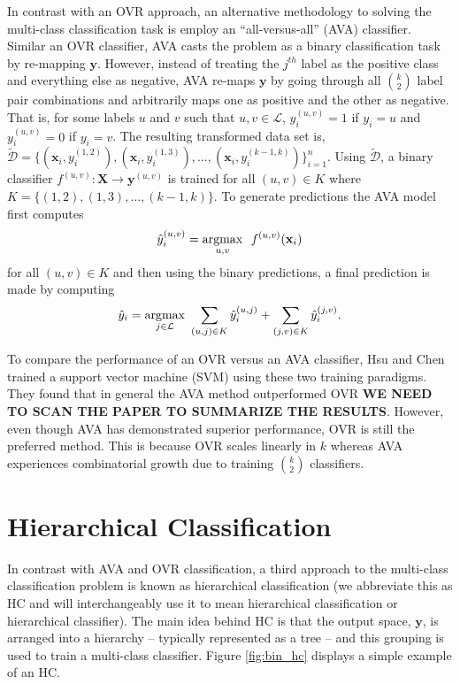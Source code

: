 \documentclass[../thesis.tex]{subfiles}
\begin{document}
In contrast with an OVR approach, an alternative methodology to solving the multi-class classification task is employ an ``all-versus-all'' (AVA) classifier. Similar an OVR classifier, AVA casts the problem as a binary classification task by re-mapping $\mathbf{y}$. However, instead of treating the $j^{th}$ label as the positive class and everything else as negative, AVA re-maps $\mathbf{y}$ by going through all $\binom{k}{2}$ label pair combinations and arbitrarily maps one as positive and the other as negative. That is, for some labels $u$ and $v$ such that $u, v \in \mathcal{L}$, $y_i^{(u,v)} = 1$ if $y_i = u$ and $y_i^{(u,v)} = 0$ if $y_i = v$. The resulting transformed data set is, $\widetilde{\mathcal{D}} = \{(\mathbf{x}_i, y_i^{(1,2)}), (\mathbf{x}_i, y_i^{(1,3)}), \ldots, (\mathbf{x}_i, y_i^{(k-1, k)})\}_{i=1}^n$. Using $\widetilde{\mathcal{D}}$, a binary classifier $f^{(u,v)}: \mathbf{X} \rightarrow \mathbf{y}^{(u,v)}$ is trained for all $(u, v) \in K$ where $K = \{(1, 2), (1, 3), \ldots, (k-1, k)\}$. To generate predictions the AVA model first computes
\begin{equation}
    \hat{y}_i^{(u,v)} = \underset{u, v}{\argmax} \ \ f^{(u,v)}(\mathbf{x}_i)
\end{equation}
for all $(u,v) \in K$ and then using the binary predictions, a final prediction is made by computing
\begin{equation}
    \hat{y}_i = \underset{j \in \mathcal{L}}{\operatorname*{argmax}} \ \sum_{(u, j) \in K} \hat{y}_i^{(u, j)} + \sum_{(j, v) \in K} \hat{y}_i^{(j, v)}.
\end{equation}

To compare the performance of an OVR versus an AVA classifier, Hsu and Chen \cite{hsu2002comparison} trained a support vector machine (SVM) using these two training paradigms. They found that in general the AVA method outperformed OVR \textbf{WE NEED TO SCAN THE PAPER TO SUMMARIZE THE RESULTS}. However, even though AVA has demonstrated superior performance, OVR is still the preferred method. This is because OVR scales linearly in $k$ whereas AVA experiences combinatorial growth due to training $\binom{k}{2}$ classifiers.

\section{Hierarchical Classification}
In contrast with AVA and OVR classification, a third approach to the multi-class classification problem is known as hierarchical classification (we abbreviate this as HC and will interchangeably use it to mean hierarchical classification or hierarchical classifier). The main idea behind HC is that the output space, $\mathbf{y}$, is arranged into a hierarchy -- typically represented as a tree -- and this grouping is used to train a multi-class classifier. Figure \ref{fig:bin_hc} displays a simple example of an HC.
\end{document}

